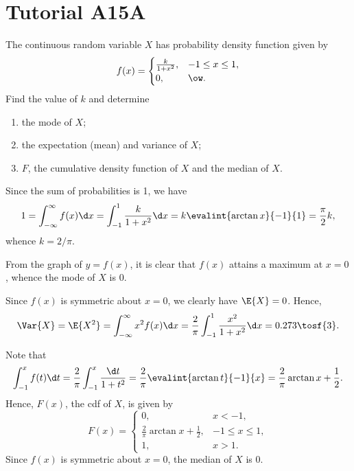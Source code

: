 \section{Tutorial A15A}

\begin{problem}
    The continuous random variable $X$ has probability density function given by \[f(x) = \begin{cases}
        \frac{k}{1 + x^2}, & -1 \leq x \leq 1,\\
        0, & \ow.
    \end{cases}\]
    Find the value of $k$ and determine
    \begin{enumerate}
        \item the mode of $X$;
        \item the expectation (mean) and variance of $X$;
        \item $F$, the cumulative density function of $X$ and the median of $X$.
    \end{enumerate}
\end{problem}
\begin{solution}
    Since the sum of probabilities is 1, we have \[1 = \int_{-\infty}^{\infty} f(x) \d x = \int_{-1}^1 \frac{k}{1 + x^2} \d x = k \evalint{\arctan x}{-1}{1} = \frac\pi2 k,\] whence $k = 2/\pi$.

    \begin{ppart}
        From the graph of $y = f(x)$, it is clear that $f(x)$ attains a maximum at $x = 0$, whence the mode of $X$ is $0$.
    \end{ppart}
    \begin{ppart}
        Since $f(x)$ is symmetric about $x = 0$, we clearly have $\E{X} = 0$. Hence, \[\Var{X} = \E{X^2} = \int_{-\infty}^\infty x^2 f(x) \d x = \frac2\pi \int_{-1}^1 \frac{x^2}{1 + x^2} \d x = 0.273 \tosf{3}.\]
    \end{ppart}
    \begin{ppart}
        Note that \[\int_{-1}^{x} f(t) \d t = \frac2\pi \int_{-1}^x \frac{\d t}{1 + t^2} = \frac2\pi \evalint{\arctan t}{-1}{x} = \frac2\pi \arctan x + \frac12.\] Hence, $F(x)$, the cdf of $X$, is given by \[F(x) = \begin{cases}
            0, & x < -1,\\
            \frac2\pi \arctan x + \frac12, & -1 \leq x \leq 1,\\
            1, & x > 1.
        \end{cases}\]
        Since $f(x)$ is symmetric about $x = 0$, the median of $X$ is 0.
    \end{ppart}
\end{solution}

